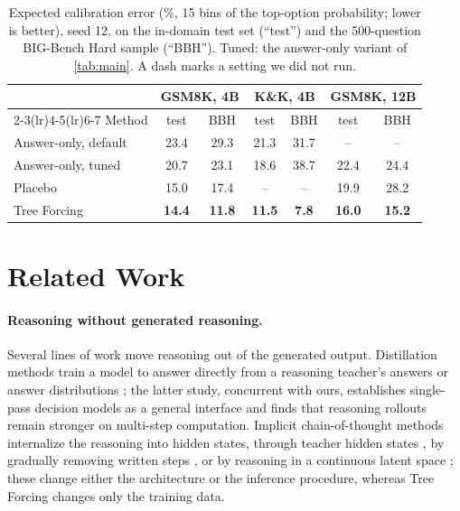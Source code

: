 \documentclass{article}
\newcommand{\tf}{Tree Forcing}
\begin{document}
\begin{table}[t]
\centering
\footnotesize
\caption{Expected calibration error (\%, 15 bins of the top-option probability; lower is better), seed 12, on the
in-domain test set (``test'') and the 500-question BIG-Bench Hard sample (``BBH''). Tuned: the answer-only variant of
\cref{tab:main}. A dash marks a setting we did not run.}
\label{tab:calibration}
\begin{tabular}{lcccccc}
\toprule
& \multicolumn{2}{c}{GSM8K, 4B} & \multicolumn{2}{c}{K\&K, 4B} & \multicolumn{2}{c}{GSM8K, 12B} \\
\cmidrule(lr){2-3}\cmidrule(lr){4-5}\cmidrule(lr){6-7}
Method & test & BBH & test & BBH & test & BBH \\
\midrule
Answer-only, default & 23.4 & 29.3 & 21.3 & 31.7 & -- & -- \\
Answer-only, tuned & 20.7 & 23.1 & 18.6 & 38.7 & 22.4 & 24.4 \\
Placebo & 15.0 & 17.4 & -- & -- & 19.9 & 28.2 \\
\tf{} & \textbf{14.4} & \textbf{11.8} & \textbf{11.5} & \textbf{7.8} & \textbf{16.0} & \textbf{15.2} \\
\bottomrule
\end{tabular}
\end{table}

\section{Related Work}
\label{sec:related}

\paragraph{Reasoning without generated reasoning.} Several lines of work move reasoning out of the generated output.
Distillation methods train a model to answer directly from a reasoning teacher's answers \citep{yu2024system2} or
answer distributions \citep{ldm2026}; the latter study, concurrent with ours, establishes single-pass decision models
as a general interface and finds that reasoning rollouts remain stronger on multi-step computation. Implicit
chain-of-thought methods internalize the reasoning into hidden states, through teacher hidden states
\citep{deng2023implicit}, by gradually removing written steps \citep{deng2024internalize}, or by reasoning in a
continuous latent space \citep{hao2024coconut}; these change either the architecture or the inference procedure,
whereas \tf{} changes only the training data.
\end{document}
